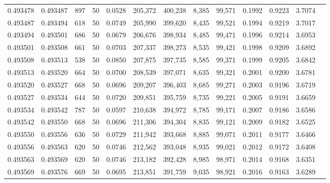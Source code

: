 \begin{tabular}{rrrrrrrrrrrrr}
0.493478 & 0.493487 &   897 &  50 &                                     0.0528 & 205,372 & 400,238 &   8,385 &  99,571 & 0.1992 & 0.9223 & 3.7074 \\
0.493487 & 0.493494 &   618 &  50 &                                     0.0749 & 205,990 & 399,620 &   8,435 &  99,521 & 0.1994 & 0.9219 & 3.7017 \\
0.493494 & 0.493501 &   686 &  50 &                                     0.0679 & 206,676 & 398,934 &   8,485 &  99,471 & 0.1996 & 0.9214 & 3.6953 \\
0.493501 & 0.493508 &   661 &  50 &                                     0.0703 & 207,337 & 398,273 &   8,535 &  99,421 & 0.1998 & 0.9209 & 3.6892 \\
0.493508 & 0.493513 &   538 &  50 &                                     0.0850 & 207,875 & 397,735 &   8,585 &  99,371 & 0.1999 & 0.9205 & 3.6842 \\
0.493513 & 0.493520 &   664 &  50 &                                     0.0700 & 208,539 & 397,071 &   8,635 &  99,321 & 0.2001 & 0.9200 & 3.6781 \\
0.493520 & 0.493527 &   668 &  50 &                                     0.0696 & 209,207 & 396,403 &   8,685 &  99,271 & 0.2003 & 0.9196 & 3.6719 \\
0.493527 & 0.493534 &   644 &  50 &                                     0.0720 & 209,851 & 395,759 &   8,735 &  99,221 & 0.2005 & 0.9191 & 3.6659 \\
0.493534 & 0.493542 &   787 &  50 &                                     0.0597 & 210,638 & 394,972 &   8,785 &  99,171 & 0.2007 & 0.9186 & 3.6586 \\
0.493542 & 0.493550 &   668 &  50 &                                     0.0696 & 211,306 & 394,304 &   8,835 &  99,121 & 0.2009 & 0.9182 & 3.6525 \\
0.493550 & 0.493556 &   636 &  50 &                                     0.0729 & 211,942 & 393,668 &   8,885 &  99,071 & 0.2011 & 0.9177 & 3.6466 \\
0.493556 & 0.493563 &   620 &  50 &                                     0.0746 & 212,562 & 393,048 &   8,935 &  99,021 & 0.2012 & 0.9172 & 3.6408 \\
0.493563 & 0.493569 &   620 &  50 &                                     0.0746 & 213,182 & 392,428 &   8,985 &  98,971 & 0.2014 & 0.9168 & 3.6351 \\
0.493569 & 0.493576 &   669 &  50 &                                     0.0695 & 213,851 & 391,759 &   9,035 &  98,921 & 0.2016 & 0.9163 & 3.6289 \\

\end{tabular}
